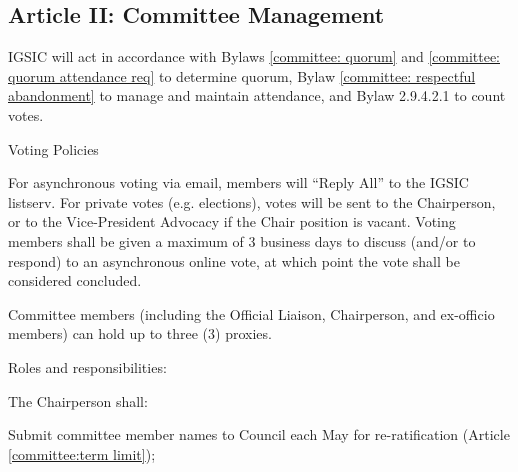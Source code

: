 \subsection{Article II: Committee Management}
\begin{longenum}[ label*=\thesubsection.\arabic*., align=left] 
\item IGSIC will act in accordance with Bylaws \ref{committee: quorum} and \ref{committee: quorum attendance req} to determine quorum, Bylaw \ref{committee: respectful abandonment} to manage and maintain attendance, and Bylaw 2.9.4.2.1 to count votes.
\item Voting Policies
	\begin{longenum}[ label*=\arabic*., align=left]
		\item For asynchronous voting via email, members will ``Reply All'' to the IGSIC listserv. For private votes (e.g. elections), votes will be sent to the Chairperson, or to the Vice-President Advocacy if the Chair position is vacant. Voting members shall be given a maximum of 3 business days to discuss (and/or to respond) to an asynchronous online vote, at which point the vote shall be considered concluded.
		\item Committee members (including the Official Liaison, Chairperson, and ex-officio members) can hold up to three (3) proxies.
	\end{longenum}
\item Roles and responsibilities:
\begin{longenum}[ label*=\arabic*., align=left]
	\item The Chairperson shall:
	\begin{longenum}[ label*=\arabic*., align=left]
		\item Submit committee member names to Council each May for re-ratification (Article \ref{committee:term limit});

\end{longenum}
\end{longenum}
\end{longenum}
